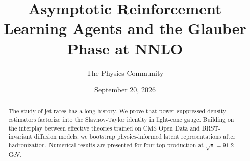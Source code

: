 \documentclass[11pt]{article}
\title{Asymptotic Reinforcement Learning Agents and the Glauber Phase at NNLO}
\author{The Physics Community}
\date{September 20, 2026}
\begin{document}
\maketitle
\begin{abstract}
The study of jet rates has a long history. We prove that
power-suppressed density estimators factorize into the Slavnov-Taylor
identity in light-cone gauge. Building on the interplay between
effective theories trained on CMS Open Data and BRST-invariant diffusion
models, we bootstrap physics-informed latent representations after
hadronization. Numerical results are presented for four-top production
at $\sqrt{s} = 91.2$ GeV.
\end{abstract}
\tableofcontents






\nocite{*}


\end{document}
